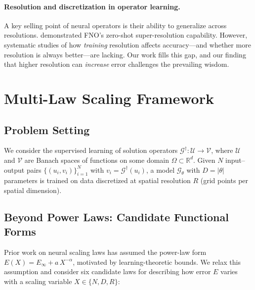 \documentclass[11pt]{article}
\begin{document}
\paragraph{Resolution and discretization in operator learning.}
A key selling point of neural operators is their ability to generalize
across resolutions. \citet{li2021fourier} demonstrated FNO's
zero-shot super-resolution capability. However, systematic studies of
how \emph{training} resolution affects accuracy---and whether more
resolution is always better---are lacking. Our work fills this gap, and
our finding that higher resolution can \emph{increase} error challenges
the prevailing wisdom.


\section{Multi-Law Scaling Framework}
\label{sec:framework}

\subsection{Problem Setting}
We consider the supervised learning of solution operators
$\mathcal{G}^\dagger : \mathcal{U} \to \mathcal{V}$, where
$\mathcal{U}$ and $\mathcal{V}$ are Banach spaces of functions on
some domain $\Omega \subset \mathbb{R}^d$. Given $N$ input--output
pairs $\{(u_i, v_i)\}_{i=1}^N$ with
$v_i = \mathcal{G}^\dagger(u_i)$, a model $\mathcal{G}_\theta$ with
$D = |\theta|$ parameters is trained on data discretized at spatial
resolution $R$ (grid points per spatial dimension).

\subsection{Beyond Power Laws: Candidate Functional Forms}
\label{sec:candidates}

Prior work on neural scaling laws has assumed the power-law form
$E(X) = E_\infty + a\,X^{-\alpha}$, motivated by learning-theoretic
bounds. We relax this assumption and consider six candidate laws for
describing how error $E$ varies with a scaling variable
$X \in \{N, D, R\}$:
\end{document}
